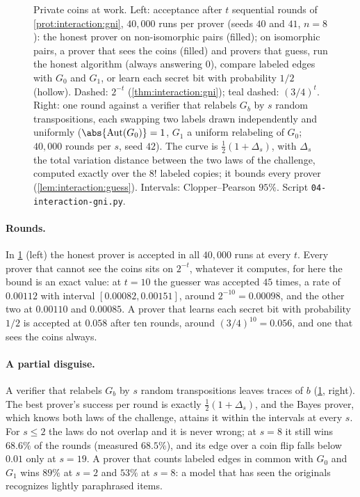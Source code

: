 \begin{refsection}
\begin{figure}[t]
\caption{Private coins at work. Left: acceptance after $t$ sequential rounds of \cref{prot:interaction:gni}, $40{,}000$ runs per prover (seeds $40$ and $41$, $n=8$): the honest prover on non-isomorphic pairs (filled); on isomorphic pairs, a prover that sees the coins (filled) and provers that guess, run the honest algorithm (always answering $0$), compare labeled edges with $G_0$ and $G_1$, or learn each secret bit with probability $1/2$ (hollow). Dashed: $2^{-t}$ (\cref{thm:interaction:gni}); teal dashed: $(3/4)^t$. Right: one round against a verifier that relabels $G_b$ by $s$ random transpositions, each swapping two labels drawn independently and uniformly ($\abs{\interactionaut(G_0)}=1$, $G_1$ a uniform relabeling of $G_0$; $40{,}000$ rounds per $s$, seed $42$). The curve is $\frac12(1+\Delta_s)$, with $\Delta_s$ the total variation distance between the two laws of the challenge, computed exactly over the $8!$ labeled copies; it bounds every prover (\cref{lem:interaction:guess}). Intervals: Clopper--Pearson $95\%$. Script \texttt{04-interaction-gni.py}.}\label{fig:interaction:rounds}
\end{figure}

\paragraph{Rounds.} In \cref{fig:interaction:rounds} (left) the honest prover is accepted in all $40{,}000$ runs at every $t$. Every prover that cannot see the coins sits on $2^{-t}$, whatever it computes, for here the bound is an exact value: at $t=10$ the guesser was accepted $45$ times, a rate of $0.00112$ with interval $[0.00082,0.00151]$, around $2^{-10}=0.00098$, and the other two at $0.00110$ and $0.00085$. A prover that learns each secret bit with probability $1/2$ is accepted at $0.058$ after ten rounds, around $(3/4)^{10}=0.056$, and one that sees the coins always.

\paragraph{A partial disguise.} A verifier that relabels $G_b$ by $s$ random transpositions leaves traces of $b$ (\cref{fig:interaction:rounds}, right). The best prover's success per round is exactly $\frac12(1+\Delta_s)$, and the Bayes prover, which knows both laws of the challenge, attains it within the intervals at every $s$. For $s\le2$ the laws do not overlap and it is never wrong; at $s=8$ it still wins $68.6\%$ of the rounds (measured $68.5\%$), and its edge over a coin flip falls below $0.01$ only at $s=19$. A prover that counts labeled edges in common with $G_0$ and $G_1$ wins $89\%$ at $s=2$ and $53\%$ at $s=8$: a model that has seen the originals recognizes lightly paraphrased items.


\end{refsection}
